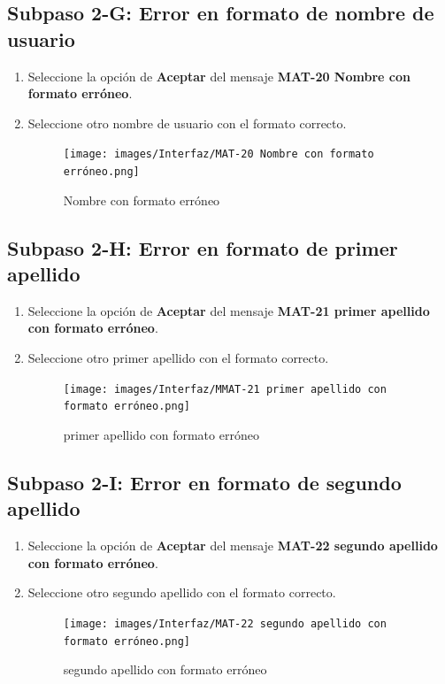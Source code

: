 \subsection{Subpaso 2-G: Error en formato de nombre de usuario}
\begin{enumerate}
	\item Seleccione la opción de \textbf{Aceptar} del mensaje
\textbf{MAT-20 Nombre con formato erróneo}.
	\item Seleccione otro nombre de usuario con el formato correcto.
	\begin{figure}[hbtp]
	\texttt{[image: images/Interfaz/MAT-20 Nombre con formato erróneo.png]}
	\caption{Nombre con formato erróneo}
	\end{figure}
\end{enumerate}

\subsection{Subpaso 2-H: Error en formato de primer apellido}
\begin{enumerate}
	\item Seleccione la opción de \textbf{Aceptar} del mensaje
\textbf{MAT-21 primer apellido con formato erróneo}.
	\item Seleccione otro primer apellido con el formato correcto.
	\begin{figure}[hbtp]
	\texttt{[image: images/Interfaz/MMAT-21 primer apellido con formato erróneo.png]}
	\caption{primer apellido con formato erróneo}
	\end{figure}
\end{enumerate}

\subsection{Subpaso 2-I: Error en formato de segundo apellido}
\begin{enumerate}
	\item Seleccione la opción de \textbf{Aceptar} del mensaje
\textbf{MAT-22 segundo apellido con formato erróneo}.
	\item Seleccione otro segundo apellido con el formato correcto.
	\begin{figure}[hbtp]
	\texttt{[image: images/Interfaz/MAT-22 segundo apellido con formato erróneo.png]}
	\caption{segundo apellido con formato erróneo}
	\end{figure}
\end{enumerate}

